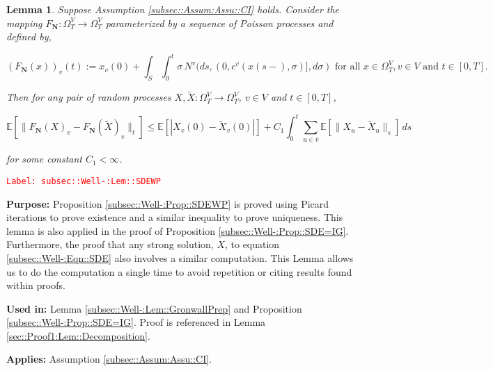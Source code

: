 \documentclass[12pt]{article}
\newcommand{\mb}{\mathbb}
\newcommand{\ra}{\rightarrow}
\newcommand{\ov}{\overline}
\newcommand{\te}{\text}
\newcommand{\tr}{\textcolor{red}}
\newcommand{\labe}[1]{\tr{\texttt{Label: #1}}}
\newcommand{\purpose}{\textbf{Purpose: }}
\newcommand{\usein}{\textbf{Used in: }}
\newcommand{\app}{\textbf{Applies: }}
\newcommand{\ex}[1]{\mb{E}\left[#1\right]}			%
\renewcommand{\v}{v}							%
\newcommand{\vv}{u}								%
\renewcommand{\S}{S}							%
\newcommand{\s}{\sigma}							%
\newcommand{\T}{T}								%
\newcommand{\x}{x}								%
\renewcommand{\t}{t}							%
\newcommand{\sset}{\Omega}						%
\renewcommand{\tt}{s}							%
\newcommand{\X}{X}								%
\newcommand{\IGr}{c}							%
\newcommand{\vind}[1]{^{#1}}					%
\newcommand{\vsi}[1]{^{#1}}						%
\newcommand{\cind}[1]{_{#1}}					%
\newcommand{\cl}{\ov}							%
\newcommand{\tp}[1]{(#1)}						%
\newcommand{\ts}[1]{_{#1}}						%
\newcommand{\const}{C}							%
\newcommand{\poisses}{\mathbf{N}}				%
\newcommand{\poiss}{N}							%
\newcommand{\Fpo}{F_{\poisses}}					%
\newcommand{\alt}[1]{\widetilde{#1}}			%
\newcommand{\indx}[1]{_{#1}}					%
\newtheorem{lem}[thms]{Lemma}
\begin{document}
\begin{lem}
Suppose Assumption \ref{subsec::Assum:Assu::CI} holds. Consider the mapping \(\Fpo: \sset\vsi{V}\ts{\T} \ra \sset\vsi{V}\ts{\T}\) parameterized by a sequence of Poisson processes and defined by,

\[\left(\Fpo(\x)\right)\cind{\v}\tp{\t} := \x\cind{\v}\tp{0} + \int_\S\int_0^\t \s \,\poiss\vind{\v}(d\tt,(0,\IGr\vind{\v}(\x\tp{\tt-},\s)],d\s) \te{ for all }\x \in \sset\vsi{V}\ts{\T}, \v \in V\te{ and }\t \in [0,\T].\]

Then for any pair of random processes \(\X,\alt{\X}:\sset\vsi{V}\ts{\T} \ra \sset\vsi{V}\ts{\T}\), \(\v\in V\) and \(\t \in [0,\T]\),

\[\ex{\|\Fpo(\X)\cind{\v} - \Fpo(\alt{\X})\cind{\v}\|_\t} \leq \ex{|\X\cind{\v}\tp{0} - \alt{\X}\cind{\v}\tp{0}|} +  \const\indx{1}\int_0^\t \sum_{\vv\in \cl{\v}} \ex{\|\X\cind{\vv} - \alt{\X}\cind{\vv}\|_\tt}\,d\tt\]

for some constant \(\const\indx{1} < \infty\).

\label{subsec::Well-:Lem::SDEWP}
\end{lem}
\labe{subsec::Well-:Lem::SDEWP}

\purpose Proposition \ref{subsec::Well-:Prop::SDEWP} is proved using Picard iterations to prove existence and a similar inequality to prove uniqueness. This lemma is also applied in the proof of Proposition \ref{subsec::Well-:Prop::SDE=IG}. Furthermore, the proof that any strong solution, \(\X\), to equation \eqref{subsec::Well-:Eqn::SDE} also involves a similar computation. This Lemma allows us to do the computation a single time to avoid repetition or citing results found within proofs.

\usein Lemma \ref{subsec::Well-:Lem::GronwallPrep} and Proposition \ref{subsec::Well-:Prop::SDE=IG}. Proof is referenced in Lemma \ref{sec::Proof1:Lem::Decomposition}.

\app Assumption \ref{subsec::Assum:Assu::CI}.
\end{document}
